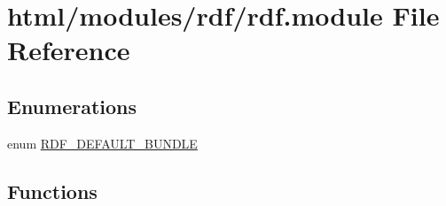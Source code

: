 \hypertarget{rdf_8module}{
\section{html/modules/rdf/rdf.module File Reference}
\label{rdf_8module}
}
\subsection*{Enumerations}
\begin{DoxyCompactItemize}
\item 
enum \hyperlink{group__rdf_ga4f749985c55ac04563d6446524062ac9}{RDF\_\-DEFAULT\_\-BUNDLE} 
\end{DoxyCompactItemize}
\subsection*{Functions}
